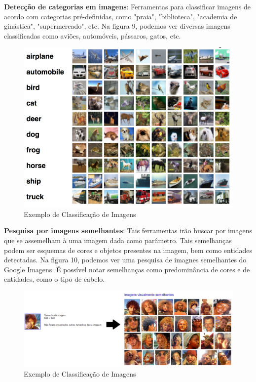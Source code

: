 \documentclass{article}
\begin{document}
\textbf{Detecção de categorias em imagens}: Ferramentas para classificar imagens de acordo com categorias pré-definidas, como "praia", "biblioteca", "academia de ginástica", "supermercado", etc. Na figura 9, podemos ver diversas imagens classificadas como aviões, automóveis, pássaros, gatos, etc.\\
\begin{figure}[H]
    \centering
    \includegraphics[scale=0.3]{imagens/classificacao_imagens.png}
    \caption{Exemplo de Classificação de Imagens}
    \label{fig:classificação_imagens}
\end{figure}{}
\textbf{Pesquisa por imagens semelhantes}: Tais ferramentas irão buscar por imagens que se assemelham à uma imagem dada como parâmetro. Tais semelhanças podem ser esquemas de cores e objetos presentes na imagem, bem como entidades detectadas. Na figura 10, podemos ver uma pesquisa de imagnes semelhantes do Google Imagens. É possível notar semelhanças como predominância de cores e de entidades, como o tipo de cabelo.\\
\begin{figure}[H]
    \centering
    \includegraphics[scale=0.4]{imagens/imagens_semelhantes.png}
    \caption{Exemplo de Classificação de Imagens}
    \label{fig:imagens_semelhantes}
\end{figure}{}
\end{document}
